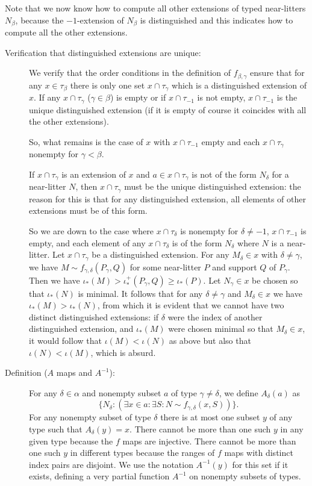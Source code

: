 \documentclass[112pt]{article}
\begin{document}
 

Note that we now know how to compute all other extensions of typed near-litters $N_\beta$, because the $-1$-extension of $N_\beta$ is distinguished and this indicates how to compute all the other extensions.



\begin{description}

\item[Verification that distinguished extensions are unique:]  

We verify  that the order conditions in the definition of $f_{\beta,\gamma}$ ensure that for any $x \in \tau_\beta$ there is only one set $x \cap \tau_\gamma$ which is a distinguished extension of $x$.  If any $x \cap \tau_\gamma$ ($\gamma \in \beta$) is empty or if $x \cap \tau_{-1}$ is not empty, $x \cap \tau_{-1}$ is the unique distinguished extension
(if it is empty of course it coincides with all the other extensions).

So, what remains is the case of $x$ with $x \cap \tau_{-1}$ empty and each $x \cap \tau_\gamma$ nonempty for $\gamma<\beta$.

If $x \cap \tau_\gamma$ is an extension of $x$ and $a \in x \cap \tau_\gamma$ is not of the form $N_\delta$ for a near-litter $N$, then
$x \cap \tau_\gamma$ must be the unique distinguished extension:  the reason for this is that for any distinguished extension, all elements of other extensions must be of this form.

So we are down to the case where $x \cap \tau_\delta$ is nonempty for $\delta \neq -1$, $x \cap \tau_{-1}$ is empty, and each element of
any $x \cap \tau_\delta$ is of the form $N_\delta$ where $N$ is a near-litter.  Let $x \cap \tau_\gamma$ be a distinguished extension.
For any $M_\delta \in x$ with $\delta \neq \gamma$, we have $M \sim f_{\gamma,\delta}(P_\gamma,Q)$ for some near-litter $P$ and support $Q$
of $P_\gamma$.  Then we have $\iota_*(M) > \iota^+_*(P_\gamma,Q) \geq \iota_*(P)$.  Let $N_\gamma\in x$ be chosen so that $\iota_*(N)$ is minimal.
It follows that for any $\delta \neq \gamma$ and $M_\delta \in x$ we have $\iota_*(M) > \iota_*(N)$, from which it is evident that we cannot have two distinct distinguished extensions:
if $\delta$ were the index of another distinguished extension, and $\iota_*(M)$ were chosen minimal so that $M_\delta \in x$, it would follow that $\iota(M)<\iota(N)$ as above
but also that $\iota(N) < \iota(M)$, which is absurd.

\item[Definition ($A$ maps and $A^{-1}$):] For any $\delta \in \alpha$ and nonempty subset $a$ of type $\gamma \neq \delta$, we define $A_\delta(a)$ as $$\{N_\delta:(\exists x \in a:\exists S:N \sim f_{\gamma,\delta}(x,S))\}.$$  For any nonempty subset of type $\delta$ there is at most one subset $y$ of any type such that $A_\delta(y)=x$.  There cannot be more than one such $y$ in any given type because the $f$ maps are injective.  There cannot be more than one such $y$ in different types because the ranges of $f$ maps with distinct index pairs are disjoint.   We use the notation $A^{-1}(y)$ for this set if it exists, defining a very partial function $A^{-1}$ on nonempty subsets of types.


\end{description}
\end{document}
